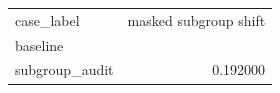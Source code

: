 \begin{tabular}{lr}
\toprule
case_label & masked subgroup shift \\
baseline &  \\
\midrule
subgroup_audit & 0.192000 \\
\bottomrule
\end{tabular}
